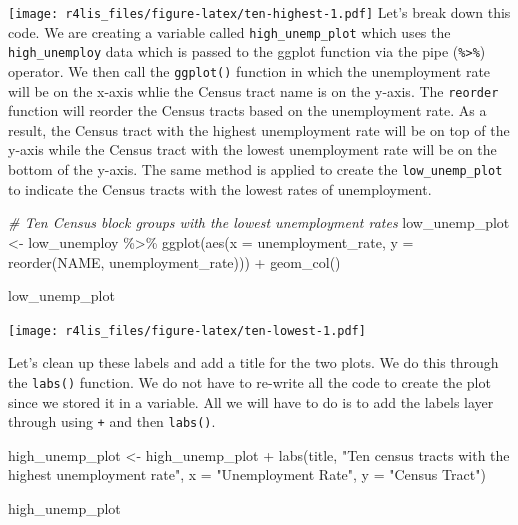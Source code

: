 \documentclass[
  krantz2]{krantz}
\makeatletter
\newenvironment{Shaded}{\begin{snugshade}}{\end{snugshade}}
\newcommand{\AttributeTok}[1]{\textcolor[rgb]{0.61,0.61,0.61}{#1}}
\newcommand{\CommentTok}[1]{\textcolor[rgb]{0.37,0.37,0.37}{\textit{#1}}}
\newcommand{\FunctionTok}[1]{\textcolor[rgb]{0,0,0}{#1}}
\newcommand{\NormalTok}[1]{#1}
\newcommand{\OtherTok}[1]{\textcolor[rgb]{0.37,0.37,0.37}{#1}}
\newcommand{\SpecialCharTok}[1]{\textcolor[rgb]{0,0,0}{#1}}
\newcommand{\StringTok}[1]{\textcolor[rgb]{0.5,0.5,0.5}{#1}}
\newenvironment{kframe}{%
\medskip{}
\setlength{\fboxsep}{.8em}
 \def\at@end@of@kframe{}%
 \ifinner\ifhmode%
  \def\at@end@of@kframe{\end{minipage}}%
  \begin{minipage}{\columnwidth}%
 \fi\fi%
 \def\FrameCommand##1{\hskip\@totalleftmargin \hskip-\fboxsep
 \colorbox{shadecolor}{##1}\hskip-\fboxsep
     \hskip-\linewidth \hskip-\@totalleftmargin \hskip\columnwidth}%
 \MakeFramed {\advance\hsize-\width
   \@totalleftmargin\z@ \linewidth\hsize
   \@setminipage}}%
 {\par\unskip\endMakeFramed%
 \at@end@of@kframe}
\renewenvironment{Shaded}{\begin{kframe}}{\end{kframe}}
\makeatother
\begin{document}
\texttt{[image: r4lis\_files/figure-latex/ten-highest-1.pdf]}
Let's break down this code. We are creating a variable called \texttt{high\_unemp\_plot} which uses the \texttt{high\_unemploy} data which is passed to the ggplot function via the pipe (\texttt{\%\textgreater{}\%}) operator. We then call the \texttt{ggplot()} function in which the unemployment rate will be on the x-axis whlie the Census tract name is on the y-axis. The \texttt{reorder} function will reorder the Census tracts based on the unemployment rate. As a result, the Census tract with the highest unemployment rate will be on top of the y-axis while the Census tract with the lowest unemployment rate will be on the bottom of the y-axis. The same method is applied to create the \texttt{low\_unemp\_plot} to indicate the Census tracts with the lowest rates of unemployment.

\begin{Shaded}
\begin{Highlighting}[]
\CommentTok{\# Ten Census block groups with the lowest unemployment rates}
\NormalTok{low\_unemp\_plot }\OtherTok{\textless{}{-}}\NormalTok{ low\_unemploy }\SpecialCharTok{\%\textgreater{}\%}
  \FunctionTok{ggplot}\NormalTok{(}\FunctionTok{aes}\NormalTok{(}\AttributeTok{x =}\NormalTok{ unemployment\_rate, }\AttributeTok{y =} \FunctionTok{reorder}\NormalTok{(NAME, unemployment\_rate))) }\SpecialCharTok{+}  \FunctionTok{geom\_col}\NormalTok{() }

\NormalTok{low\_unemp\_plot}
\end{Highlighting}
\end{Shaded}

\texttt{[image: r4lis\_files/figure-latex/ten-lowest-1.pdf]}

Let's clean up these labels and add a title for the two plots. We do this through the \texttt{labs()} function. We do not have to re-write all the code to create the plot since we stored it in a variable. All we will have to do is to add the labels layer through using \texttt{+} and then \texttt{labs()}.

\begin{Shaded}
\begin{Highlighting}[]
\NormalTok{high\_unemp\_plot }\OtherTok{\textless{}{-}}\NormalTok{ high\_unemp\_plot }\SpecialCharTok{+}
  \FunctionTok{labs}\NormalTok{(title, }\StringTok{"Ten census tracts with the highest unemployment rate"}\NormalTok{, }\AttributeTok{x =} \StringTok{"Unemployment Rate"}\NormalTok{, }\AttributeTok{y =} \StringTok{"Census Tract"}\NormalTok{)}

\NormalTok{high\_unemp\_plot}
\end{Highlighting}
\end{Shaded}
\end{document}
